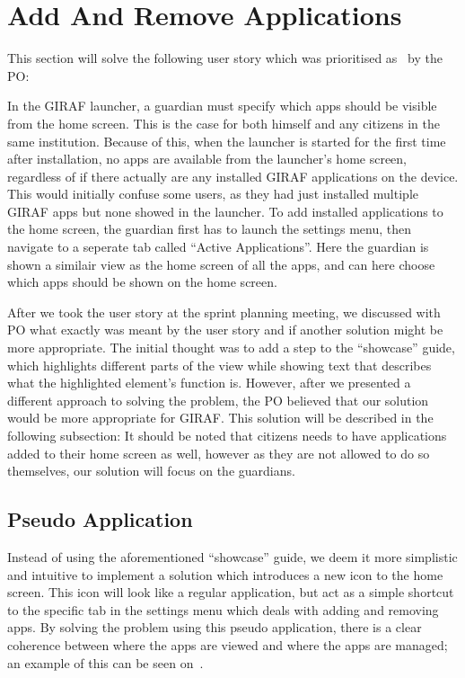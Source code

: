 \section{Add And Remove Applications}
\label{sec:add_and_remove_applications}
This section will solve the following user story which was prioritised as \pmedhigh~by the PO: 

In the GIRAF launcher, a guardian must specify which apps should be visible from the home screen.
This is the case for both himself and any citizens in the same institution.
Because of this, when the launcher is started for the first time after installation, no apps are available from the launcher's home screen, regardless of if there actually are any installed GIRAF applications on the device.
This would initially confuse some users, as they had just installed multiple GIRAF apps but none showed in the launcher.
To add installed applications to the home screen, the guardian first has to launch the settings menu, then navigate to a seperate tab called \enquote{Active Applications}.
Here the guardian is shown a similair view as the home screen of all the apps, and can here choose which apps should be shown on the home screen.

After we took the user story at the sprint planning meeting, we discussed with PO what exactly was meant by the user story and if another solution might be more appropriate.
The initial thought was to add a step to the \enquote{showcase} guide, which highlights different parts of the view while showing text that describes what the highlighted element's function is.
However, after we presented a different approach to solving the problem, the PO believed that our solution would be more appropriate for GIRAF.
This solution will be described in the following subsection:
It should be noted that citizens needs to have applications added to their home screen as well, however as they are not allowed to do so themselves, our solution will focus on the guardians.

\subsection{Pseudo Application}
\label{sub:pseudo_application}
Instead of using the aforementioned \enquote{showcase} guide, we deem it more simplistic and intuitive to implement a solution which introduces a new icon to the home screen.
This icon will look like a regular application, but act as a simple shortcut to the specific tab in the settings menu which deals with adding and removing apps.
By solving the problem using this pseudo application, there is a clear coherence between where the apps are viewed and where the apps are managed; an example of this can be seen on~.

